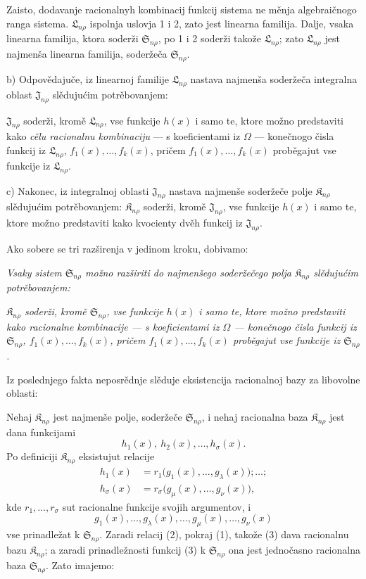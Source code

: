 \documentclass[11pt]{article}
\providecommand{\Kfield}{\mathfrak{K}}
\providecommand{\Ssys}{\mathfrak{S}}
\providecommand{\Jdom}{\mathfrak{J}}
\providecommand{\Lsys}{\mathfrak{L}}
\begin{document}
Zaisto, dodavanje racionalnyh kombinacij funkcij sistema ne měnja algebraičnogo ranga sistema. $\Lsys_{n\rho}$ ispolnja uslovja 1 i 2, zato jest linearna familija. Dalje, vsaka linearna familija, ktora soderži $\Ssys_{n\rho}$, po 1 i 2 soderži takože $\Lsys_{n\rho}$; zato $\Lsys_{n\rho}$ jest najmenša linearna familija, soderžeča $\Ssys_{n\rho}$.

b) Odpovědajuče, iz linearnoj familije $\Lsys_{n\rho}$ nastava najmenša soderžeča integralna oblast $\Jdom_{n\rho}$ slědujućim potrěbovanjem:

$\Jdom_{n\rho}$ soderži, kromě $\Lsys_{n\rho}$, vse funkcije $h(x)$ i samo te, ktore možno predstaviti kako {\itshape cělu racionalnu kombinaciju} --- s koeficientami iz $\Omega$ --- konečnogo čisla funkcij iz $\Lsys_{n\rho}$, $f_1(x),\ldots,f_k(x)$, pričem $f_1(x),\ldots,f_k(x)$ proběgajut vse funkcije iz $\Lsys_{n\rho}$.

c) Nakonec, iz integralnoj oblasti $\Jdom_{n\rho}$ nastava najmenše soderžeče polje $\Kfield_{n\rho}$ slědujućim potrěbovanjem: $\Kfield_{n\rho}$ soderži, kromě $\Jdom_{n\rho}$, vse funkcije $h(x)$ i samo te, ktore možno predstaviti kako kvocienty dvěh funkcij iz $\Jdom_{n\rho}$.

Ako sobere se tri razširenja v jedinom kroku, dobivamo:

{\itshape Vsaky sistem $\Ssys_{n\rho}$ možno razširiti do najmenšego soderžečego polja $\Kfield_{n\rho}$ slědujućim potrěbovanjem:}

{\itshape $\Kfield_{n\rho}$ soderži, kromě $\Ssys_{n\rho}$, vse funkcije $h(x)$ i samo te, ktore možno predstaviti kako racionalne kombinacije --- s koeficientami iz $\Omega$ --- konečnogo čisla funkcij iz $\Ssys_{n\rho}$, $f_1(x),\ldots,f_k(x)$, pričem $f_1(x),\ldots,f_k(x)$ proběgajut vse funkcije iz $\Ssys_{n\rho}$.}

Iz poslednjego fakta neposrědnje slěduje eksistencija racionalnoj bazy za libovolne oblasti:

Nehaj $\Kfield_{n\rho}$ jest najmenše polje, soderžeče $\Ssys_{n\rho}$, i nehaj racionalna baza $\Kfield_{n\rho}$ jest dana funkcijami
\begin{equation}
  h_1(x),\ h_2(x),\ldots,h_\sigma(x).
\tag{1}
\end{equation}
Po definiciji $\Kfield_{n\rho}$ eksistujut relacije
\begin{equation}
\begin{aligned}
 h_1(x)&=r_1\bigl(g_1(x),\ldots,g_\lambda(x)\bigr);\ldots;\\
 h_\sigma(x)&=r_\sigma\bigl(g_\mu(x),\ldots,g_\nu(x)\bigr),
\end{aligned}
\tag{2}
\end{equation}
kde $r_1,\ldots,r_\sigma$ sut racionalne funkcije svojih argumentov, i
\begin{equation}
  g_1(x),\ldots,g_\lambda(x),\ldots,
  g_\mu(x),\ldots,g_\nu(x)
\tag{3}
\end{equation}
vse prinadležat k $\Ssys_{n\rho}$. Zaradi relacij (2), pokraj (1), takože (3) dava racionalnu bazu $\Kfield_{n\rho}$; a zaradi prinadležnosti funkcij (3) k $\Ssys_{n\rho}$ ona jest jednočasno racionalna baza $\Ssys_{n\rho}$. Zato imajemo:
\end{document}
